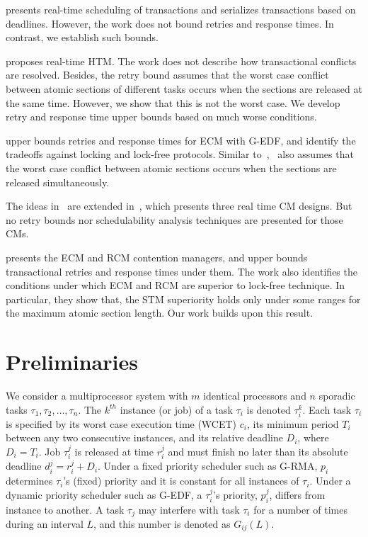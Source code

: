 \documentclass[conference]{sig-alternate}
\begin{document}
\cite{sarni2009real} presents real-time scheduling of transactions and serializes transactions based on deadlines. However, the work does not bound retries and response times. In contrast, we establish such bounds.


\cite{schoeberl2010rttm} proposes real-time HTM. The work does not describe how transactional conflicts are resolved. Besides, the retry bound assumes that the worst case conflict between atomic sections of different tasks occurs when the sections are released at the same time. However, we show that this is not the worst case. We develop retry and response time upper bounds based on much worse conditions.


\cite{key-1} upper bounds retries and response times for  ECM with G-EDF, and identify the tradeoffs against locking and lock-free protocols. Similar to~\cite{schoeberl2010rttm},~\cite{key-1} also assumes that the worst case conflict between atomic sections occurs when the sections are released simultaneously. 

The ideas in~\cite{key-1} are extended in~\cite{barrosmanaging}, which presents three real time CM designs. But no retry bounds nor schedulability analysis techniques are presented for those CMs. 

\cite{stmconcurrencycontrol:emsoft11} presents the ECM and RCM contention managers, and upper bounds transactional retries and response times under them. The work also identifies the conditions under which ECM and RCM are superior to lock-free technique. In particular, they show that, the STM superiority holds only under some ranges for the maximum atomic section length. Our work builds upon this result.

\section{Preliminaries}
\label{sec:model}

We consider a multiprocessor system with $m$ identical processors and $n$ sporadic tasks $\tau_1, \tau_2,\ldots, \tau_n$. The $k^{th}$ instance (or job) of a task $\tau_i$ is denoted $\tau_i^k$. Each task $\tau_i$ is specified by its worst case execution time (WCET) $c_i$, its minimum period $T_i$ between any two consecutive instances, and its relative deadline $D_i$, where $D_i=T_i$. Job $\tau_i^j$ is released at time $r_i^j$ and must finish no later than its absolute deadline $d_i^j=r_i^j+D_i$. Under a fixed priority scheduler such as G-RMA, $p_i$ determines $\tau_i$'s (fixed) priority and it is constant for all instances of $\tau_i$. Under a dynamic priority scheduler such as G-EDF, a $\tau_i^j$'s priority, $p_i^j$, differs from  instance to another. 
A task $\tau_j$ may interfere with task $\tau_i$ for a number of times during an interval $L$, and this number is denoted as $G_{ij}(L)$. 
\end{document}
